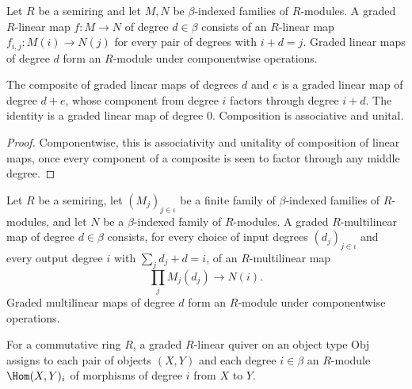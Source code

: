 \begin{definition}
\label{AInfinityTheory.GradedLinearMap}
\leanok
Let $R$ be a semiring and let $M, N$ be $\beta$-indexed families of $R$-modules.
A graded $R$-linear map $f : M \to N$ of degree $d \in \beta$ consists of an
$R$-linear map $f_{i,j} : M(i) \to N(j)$ for every pair of degrees with
$i + d = j$. Graded linear maps of degree $d$ form an $R$-module under
componentwise operations.
\end{definition}

\begin{lemma}
\label{AInfinityTheory.GradedLinearMap.comp}
\leanok
{}
The composite of graded linear maps of degrees $d$ and $e$ is a graded linear map
of degree $d + e$, whose component from degree $i$ factors through degree $i + d$.
The identity is a graded linear map of degree $0$. Composition is associative and
unital.
\end{lemma}
\begin{proof}
\leanok
Componentwise, this is associativity and unitality of composition of linear maps,
once every component of a composite is seen to factor through any middle degree.
\end{proof}

\begin{definition}
\label{AInfinityTheory.GradedMultilinearMap}
\leanok
Let $R$ be a semiring, let $(M_j)_{j \in \iota}$ be a finite family of
$\beta$-indexed families of $R$-modules, and let $N$ be a $\beta$-indexed family of
$R$-modules. A graded $R$-multilinear map of degree $d \in \beta$ consists, for every
choice of input degrees $(d_j)_{j \in \iota}$ and every output degree $i$ with
$\sum_j d_j + d = i$, of an $R$-multilinear map
\[
  \prod_j M_j(d_j) \to N(i).
\]
Graded multilinear maps of degree $d$ form an $R$-module under componentwise
operations.
\end{definition}

\begin{definition}
\label{AInfinityTheory.GradedLinearQuiver}
\leanok
For a commutative ring $R$, a graded $R$-linear quiver on an object type
$\mathrm{Obj}$ assigns to each pair of objects $(X,Y)$ and each degree $i \in \beta$
an $R$-module $\Hom(X,Y)_i$ of morphisms of degree $i$ from $X$ to $Y$.
\end{definition}
